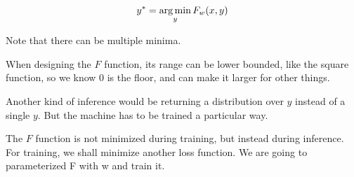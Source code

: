 \begin{equation*}
    y^* = \argmin_y F_w (x,y)
\end{equation*}

Note that there can be multiple minima.

When designing the $F$ function, its range can be lower bounded, like the square function, so we know 0 is the floor, and can make it larger for other things. 

Another kind of inference would be returning a distribution over $y$ instead of a single $y$. But the machine has to be trained a particular way.

The $F$ function is not minimized during training, but instead during inference. For training, we shall minimize another loss function. We are going to parameterized F with w and train it.


